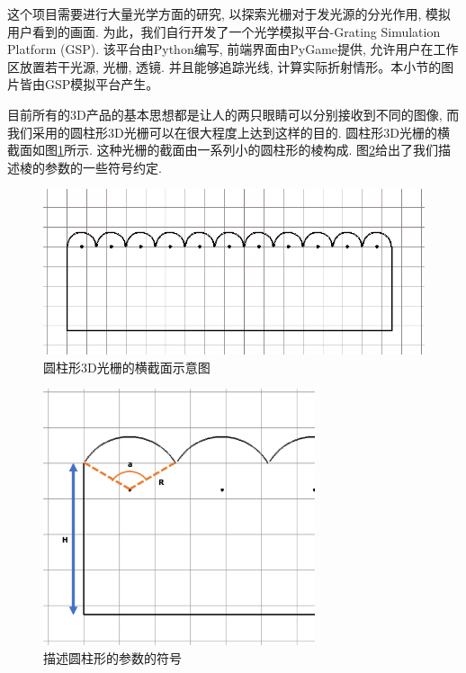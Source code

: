 \documentclass[a4paper, 11pt]{article}
\begin{document}
\begin{CJK}{UTF8}{gbsn}
这个项目需要进行大量光学方面的研究, 以探索光栅对于发光源的分光作用, 模拟用户看到的画面. 为此，我们自行开发了一个光学模拟平台-Grating Simulation Platform (GSP). 该平台由Python编写, 前端界面由PyGame提供, 允许用户在工作区放置若干光源, 光栅, 透镜. 并且能够追踪光线, 计算实际折射情形。本小节的图片皆由GSP模拟平台产生。

目前所有的3D产品的基本思想都是让人的两只眼睛可以分别接收到不同的图像, 而我们采用的圆柱形3D光栅可以在很大程度上达到这样的目的. 圆柱形3D光栅的横截面如图\ref{fig:226}所示. 这种光栅的截面由一系列小的圆柱形的棱构成. 图\ref{fig:227}给出了我们描述棱的参数的一些符号约定.
\begin{figure}[h!]
  \centerline{\includegraphics[width=\linewidth]{226.png}}
  \caption{圆柱形3D光栅的横截面示意图}
  \label{fig:226}
\end{figure}
\begin{figure}[h!]
  \centerline{\includegraphics[width=8cm]{227.png}}
  \caption{描述圆柱形的参数的符号}
  \label{fig:227}
\end{figure}


\end{CJK}
\end{document}
